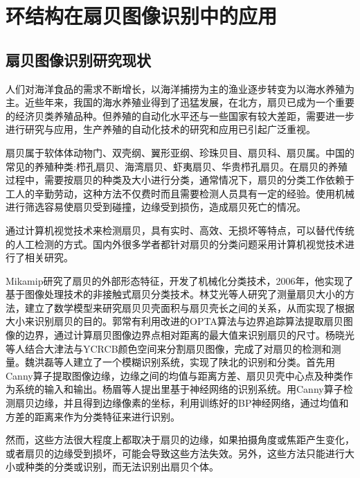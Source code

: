 

\chapter{环结构在扇贝图像识别中的应用}
\label{cha:intro}

\renewcommand\arraystretch{1}

\section{扇贝图像识别研究现状}
\label{}

人们对海洋食品的需求不断增长，以海洋捕捞为主的渔业逐步转变为以海水养殖为主。近些年来，我国的海水养殖业得到了迅猛发展，在北方，扇贝已成为一个重要的经济贝类养殖品种。但养殖的自动化水平还与一些国家有较大差距，需要进一步进行研究与应用，生产养殖的自动化技术的研究和应用已引起广泛重视\cite{zhucongrong}。

扇贝属于软体体动物门、双壳纲、翼形亚纲、珍珠贝目、扇贝科、扇贝属。中国的常见的养殖种类:栉孔扇贝、海湾扇贝、虾夷扇贝、华贵栉孔扇贝。在扇贝的养殖过程中，需要按扇贝的种类及大小进行分类，通常情况下，扇贝的分类工作依赖于工人的辛勤劳动，这种方法不仅费时而且需要检测人员具有一定的经验。使用机械进行筛选容易使扇贝受到碰撞，边缘受到损伤，造成扇贝死亡的情况。

通过计算机视觉技术来检测扇贝，具有实时、高效、无损坏等特点，可以替代传统的人工检测的方式。国内外很多学者都针对扇贝的分类问题采用计算机视觉技术进行了相关研究。

Mikamip\cite{mikamip}研究了扇贝的外部形态特征，开发了机械化分类技术，2006年，他实现了基于图像处理技术的非接触式扇贝分类技术。林艾光\cite{linaiguang}等人研究了测量扇贝大小的方法，建立了数学模型来研究扇贝贝壳面积与扇贝壳长之间的关系，从而实现了根据大小来识别扇贝的目的。郭常有\cite{guochangyou}利用改进的OPTA算法与边界追踪算法提取扇贝图像的边界，通过计算扇贝图像边界点相对距离的最大值来识别扇贝的尺寸。杨晓光\cite{yangxiaoguang}等人结合大津法与YCRCB颜色空间来分割扇贝图像，完成了对扇贝的检测和测量。魏洪磊\cite{weihonglei}等人建立了一个模糊识别系统，实现了陕北的识别和分类。首先用Canny算子提取图像边缘，边缘之间的均值与距离方差、扇贝贝壳中心点及种类作为系统的输入和输出。杨眉\cite{yangmei}等人提出里基于神经网络的识别系统。用Canny算子检测扇贝边缘，并且得到边缘像素的坐标，利用训练好的BP神经网络，通过均值和方差的距离来作为分类特征来进行识别。

然而，这些方法很大程度上都取决于扇贝的边缘，如果拍摄角度或焦距产生变化，或者扇贝的边缘受到损坏，可能会导致这些方法失效。另外，这些方法只能进行大小或种类的分类或识别，而无法识别出扇贝个体。

